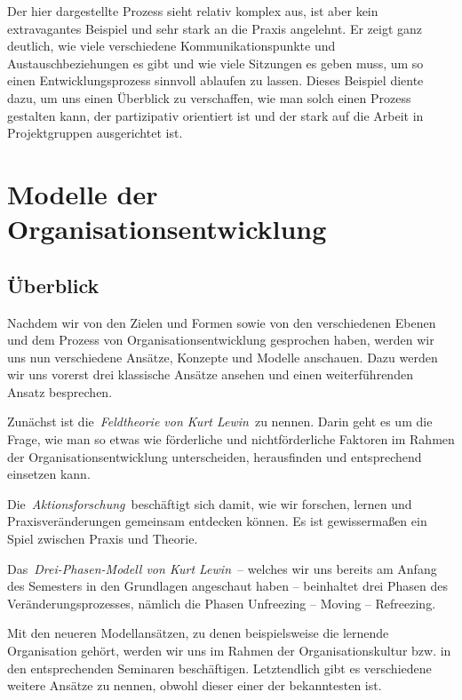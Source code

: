 \documentclass[
  letterpaper,
]{book}
\begin{document}
Der hier dargestellte Prozess sieht relativ komplex aus, ist aber kein
extravagantes Beispiel und sehr stark an die Praxis angelehnt. Er zeigt
ganz deutlich, wie viele verschiedene Kommunikationspunkte und
Austauschbeziehungen es gibt und wie viele Sitzungen es geben muss, um
so einen Entwicklungsprozess sinnvoll ablaufen zu lassen. Dieses
Beispiel diente dazu, um uns einen Überblick zu verschaffen, wie man
solch einen Prozess gestalten kann, der partizipativ orientiert ist und
der stark auf die Arbeit in Projektgruppen ausgerichtet ist.

\section{Modelle der
Organisationsentwicklung}\label{modelle-der-organisationsentwicklung}

\subsection{Überblick}\label{uxfcberblick}

Nachdem wir von den Zielen und Formen sowie von den verschiedenen Ebenen
und dem Prozess von Organisationsentwicklung gesprochen haben, werden
wir uns nun verschiedene Ansätze, Konzepte und Modelle anschauen. Dazu
werden wir uns vorerst drei klassische Ansätze ansehen und einen
weiterführenden Ansatz besprechen.

Zunächst ist die~\emph{Feldtheorie von Kurt Lewin}~zu nennen. Darin geht
es um die Frage, wie man so etwas wie förderliche und nichtförderliche
Faktoren im Rahmen der Organisationsentwicklung unterscheiden,
herausfinden und entsprechend einsetzen kann.

Die~\emph{Aktionsforschung}~beschäftigt sich damit, wie wir forschen,
lernen und Praxisveränderungen gemeinsam entdecken können. Es ist
gewissermaßen ein Spiel zwischen Praxis und Theorie.

Das~\emph{Drei-Phasen-Modell von Kurt Lewin}~-- welches wir uns bereits
am Anfang des Semesters in den Grundlagen angeschaut haben -- beinhaltet
drei Phasen des Veränderungsprozesses, nämlich die Phasen Unfreezing --
Moving -- Refreezing.

Mit den neueren Modellansätzen, zu denen beispielsweise die lernende
Organisation gehört, werden wir uns im Rahmen der Organisationskultur
bzw. in den entsprechenden Seminaren beschäftigen. Letztendlich gibt es
verschiedene weitere Ansätze zu nennen, obwohl dieser einer der
bekanntesten ist.
\end{document}
